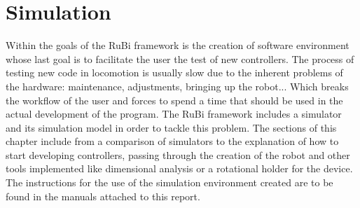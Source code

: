 \chapter{Simulation} %
\label{cha:simulation}
Within the goals of the RuBi framework is the creation of software environment whose last goal is to facilitate the user the test of new controllers.
The process of testing new code in locomotion is usually slow due to the inherent problems of the hardware: maintenance, adjustments, bringing up the robot...
Which breaks the workflow of the user and forces to spend a time that should be used in the actual development of the program.
The RuBi framework includes a simulator and its simulation model in order to tackle this problem.
The sections of this chapter include from a comparison of simulators to the explanation of how to start developing controllers, passing through the creation of the robot and other tools implemented like dimensional analysis or a rotational holder for the device.
The instructions for the use of the simulation environment created are to be found in the manuals attached to this report.







